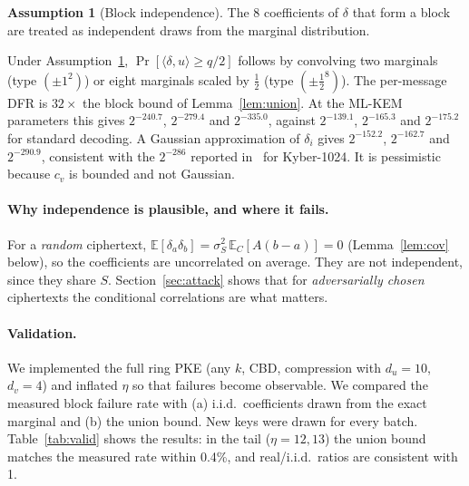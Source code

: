 \documentclass[11pt,a4paper]{article}
\theoremstyle{definition}
\newtheorem{assumption}[theorem]{Assumption}
\theoremstyle{remark}
\newcommand{\Anc}{A}
\begin{document}
\begin{assumption}[Block independence]\label{ass:ind}
The 8 coefficients of $\delta$ that form a block are treated as independent draws from the marginal distribution.
\end{assumption}

Under Assumption~\ref{ass:ind}, $\Pr[\langle\delta,u\rangle\ge q/2]$ follows by convolving two marginals (type $(\pm1^2)$) or eight marginals scaled by $\frac12$ (type $(\pm\frac12^8)$). The per-message DFR is $32\times$ the block bound of Lemma~\ref{lem:union}. At the ML-KEM parameters this gives $2^{-240.7}$, $2^{-279.4}$ and $2^{-335.0}$, against $2^{-139.1}$, $2^{-165.3}$ and $2^{-175.2}$ for standard decoding. A Gaussian approximation of $\delta_i$ gives $2^{-152.2}$, $2^{-162.7}$ and $2^{-290.9}$, consistent with the $2^{-286}$ reported in~\cite{liu26} for Kyber-1024. It is pessimistic because $c_v$ is bounded and not Gaussian.

\paragraph{Why independence is plausible, and where it fails.} For a \emph{random} ciphertext, $\mathbb E[\delta_a\delta_b]=\sigma_S^2\,\mathbb E_C[\Anc(b-a)]=0$ (Lemma~\ref{lem:cov} below), so the coefficients are uncorrelated on average. They are not independent, since they share $S$. Section~\ref{sec:attack} shows that for \emph{adversarially chosen} ciphertexts the conditional correlations are what matters.

\paragraph{Validation.} We implemented the full ring PKE (any $k$, CBD, compression with $d_u=10$, $d_v=4$) and inflated $\eta$ so that failures become observable. We compared the measured block failure rate with (a) i.i.d.\ coefficients drawn from the exact marginal and (b) the union bound. New keys were drawn for every batch. Table~\ref{tab:valid} shows the results: in the tail ($\eta=12,13$) the union bound matches the measured rate within 0.4\%, and real/i.i.d.\ ratios are consistent with 1.
\end{document}
